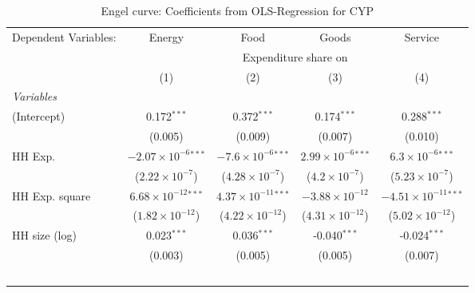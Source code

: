 
\begin{table}[htbp!]
   \centering
   \small
   \begin{adjustbox}{width = 1\textwidth, max height = 0.95\textheight, center}
      \begin{threeparttable}[b]
         \caption{\label{tab:Engel_parametric_CYP} Engel curve: Coefficients from OLS-Regression for CYP}
         \begin{tabular}{lcccc}
            \tabularnewline \midrule \midrule
            Dependent Variables: & Energy                         & Food                           & Goods                         & Service\\  
             & \multicolumn{4}{c}{Expenditure share on} \\ 
                                 & (1)                            & (2)                            & (3)                           & (4)\\  
            \midrule
            \emph{Variables}\\
            (Intercept)          & 0.172$^{***}$                  & 0.372$^{***}$                  & 0.174$^{***}$                 & 0.288$^{***}$\\   
                                 & (0.005)                        & (0.009)                        & (0.007)                       & (0.010)\\   
            HH Exp.              & $-2.07\times 10^{-6}$$^{***}$  & $-7.6\times 10^{-6}$$^{***}$   & $2.99\times 10^{-6}$$^{***}$  & $6.3\times 10^{-6}$$^{***}$\\    
                                 & ($2.22\times 10^{-7}$)         & ($4.28\times 10^{-7}$)         & ($4.2\times 10^{-7}$)         & ($5.23\times 10^{-7}$)\\    
            HH Exp. square       & $6.68\times 10^{-12}$$^{***}$  & $4.37\times 10^{-11}$$^{***}$  & $-3.88\times 10^{-12}$        & $-4.51\times 10^{-11}$$^{***}$\\    
                                 & ($1.82\times 10^{-12}$)        & ($4.22\times 10^{-12}$)        & ($4.31\times 10^{-12}$)       & ($5.02\times 10^{-12}$)\\    
            HH size (log)        & 0.023$^{***}$                  & 0.036$^{***}$                  & -0.040$^{***}$                & -0.024$^{***}$\\   
                                 & (0.003)                        & (0.005)                        & (0.005)                       & (0.007)\\   
$$
\end{tabular}
\end{threeparttable}
\end{adjustbox}
\end{table}
